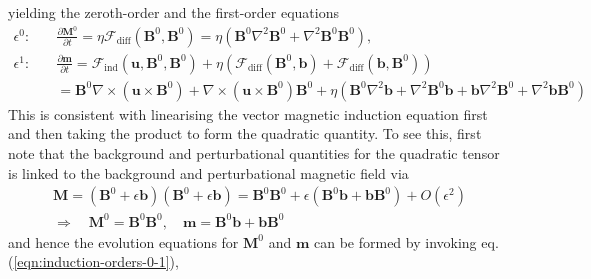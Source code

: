 yielding the zeroth-order and the first-order equations
\begin{equation}\label{eqn:induction-quadratic}
\begin{aligned}
    \epsilon^0:\quad &\frac{\partial \mathbf{M}^0}{\partial t} = \eta \mathcal{F}_\mathrm{diff}(\mathbf{B}^0, \mathbf{B}^0) = \eta \left(\mathbf{B}^0 \nabla^2 \mathbf{B}^0 + \nabla^2 \mathbf{B}^0 \mathbf{B}^0\right), \\
    \epsilon^1:\quad &\frac{\partial \mathbf{m}}{\partial t} = \mathcal{F}_\mathrm{ind}(\mathbf{u}, \mathbf{B}^0, \mathbf{B}^0) + \eta \left(\mathcal{F}_\mathrm{diff}(\mathbf{B}^0, \mathbf{b}) + \mathcal{F}_\mathrm{diff}(\mathbf{b}, \mathbf{B}^0)\right) \\
    &= \mathbf{B}^0 \nabla\times (\mathbf{u}\times \mathbf{B}^0) + \nabla\times (\mathbf{u}\times \mathbf{B}^0) \mathbf{B}^0 + \eta \left(\mathbf{B}^0 \nabla^2 \mathbf{b} + \nabla^2 \mathbf{B}^0 \mathbf{b} + \mathbf{b} \nabla^2 \mathbf{B}^0 + \nabla^2 \mathbf{b} \mathbf{B}^0\right)
\end{aligned}
\end{equation}
This is consistent with linearising the vector magnetic induction equation first and then taking the product to form the quadratic quantity. To see this, first note that the background and perturbational quantities for the quadratic tensor is linked to the background and perturbational magnetic field via
\[\begin{gathered}
    \mathbf{M} = (\mathbf{B}^0 + \epsilon \mathbf{b}) (\mathbf{B}^0 + \epsilon \mathbf{b}) = \mathbf{B}^0 \mathbf{B}^0 + \epsilon (\mathbf{B}^0 \mathbf{b} + \mathbf{b} \mathbf{B}^0) + O(\epsilon^2) \\
    \Longrightarrow \quad \mathbf{M}^0 = \mathbf{B}^0 \mathbf{B}^0,\quad \mathbf{m} = \mathbf{B}^0 \mathbf{b} + \mathbf{b} \mathbf{B}^0
\end{gathered}\]
and hence the evolution equations for $\mathbf{M}^0$ and $\mathbf{m}$ can be formed by invoking eq.(\ref{eqn:induction-orders-0-1}),

